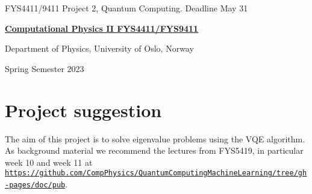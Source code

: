 \documentclass[%
oneside,                 %
final,                   %
10pt]{article}
\begin{document}

\newcommand{\exercisesection}[1]{\subsection*{#1}}






\thispagestyle{empty}

\begin{center}
{\LARGE\bf
\begin{spacing}{1.25}
FYS4411/9411 Project 2, Quantum Computing. Deadline May 31
\end{spacing}
}
\end{center}


\begin{center}
{\bf \href{{http://www.uio.no/studier/emner/matnat/fys/FYS4411/index-eng.html}}{Computational Physics II FYS4411/FYS9411}}
\end{center}

    \begin{center}
\centerline{{\small Department of Physics, University of Oslo, Norway}}
\end{center}
    

\begin{center}
Spring Semester 2023
\end{center}

\vspace{1cm}


\section*{Project suggestion}

The aim of this project is to solve eigenvalue problems using the VQE algorithm.
As background material we recommend the lectures from FYS5419, in particular week 10 and week 11 at
\href{{https://github.com/CompPhysics/QuantumComputingMachineLearning/tree/gh-pages/doc/pub}}{\nolinkurl{https://github.com/CompPhysics/QuantumComputingMachineLearning/tree/gh-pages/doc/pub}}.
\end{document}

